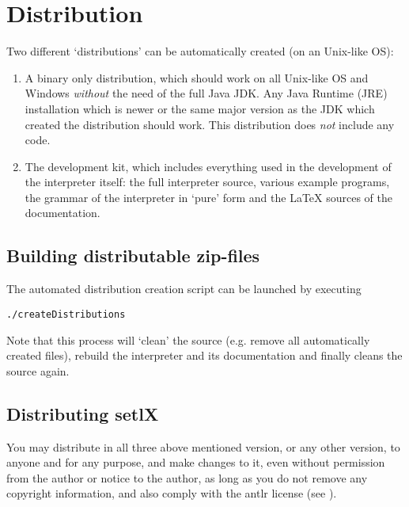 

\section{Distribution}

Two different `distributions' can be automatically created (on an Unix-like OS):

\begin{enumerate}
	\item A binary only distribution, which should work on all Unix-like OS and Windows \emph{without} the need of the full Java JDK. Any Java Runtime (JRE) installation which is newer or the same major version as the JDK which created the distribution should work. This distribution does \emph{not} include any \SetlX{} code.

	\item The development kit, which includes everything used in the development of the interpreter itself: the full interpreter source, various \SetlX{} example programs, the grammar of the interpreter in `pure' form and the \LaTeX{} sources of the documentation.
\end{enumerate}

\subsection{Building distributable zip-files}

The automated distribution creation script can be launched by executing

\begin{lstlisting}[frame=none,numbers=none]
./createDistributions
\end{lstlisting}

Note that this process will `clean' the source (e.g. remove all automatically created files), rebuild the interpreter and its documentation and finally cleans the source again.

\subsection{Distributing setlX}

You may distribute \setlX{} in all three above mentioned version, or any other version, to anyone and for any purpose, and make changes to it, even without permission from the author or notice to the author, as long as you do not remove any copyright information, and also comply with the antlr license (see ).

